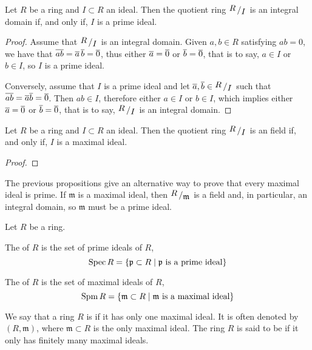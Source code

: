 \begin{prop}
	Let $R$ be a ring and $I \subset R$ an ideal. Then the quotient ring $\quotient{R}{I}$ is an integral domain if, and only if, $I$ is a prime ideal.
\end{prop}
\begin{proof}
	Assume that $\quotient{R}{I}$ is an integral domain. Given $a, b \in R$ satisfying $a b = 0$, we have that $\overline{a b} = \overline{a} \, \overline{b} = \overline{0}$, thus either $\overline{a} = \overline{0}$ or $\overline{b} = \overline{0}$, that is to say, $a \in I$ or $b \in I$, so $I$ is a prime ideal.
	
	Conversely, assume that $I$ is a prime ideal and let $\class{a}, \class{b} \in \quotient{R}{I}$ such that $\overline{a b} = \overline{a} \overline{b} = \overline{0}$. Then $a b \in I$, therefore either $a \in I$ or $b \in I$, which implies either $\overline{a} = \overline{0}$ or $\overline{b} = \overline{0}$, that is to say, $\quotient{R}{I}$ is an integral domain.
\end{proof}

\begin{prop}
	Let $R$ be a ring and $I \subset R$ an ideal. Then the quotient ring $\quotient{R}{I}$ is an field if, and only if, $I$ is a maximal ideal.
\end{prop}
\begin{proof}
	
\end{proof}

The previous propositions give an alternative way to prove that every maximal ideal is prime. If $\mathfrak{m}$ is a maximal ideal, then $\quotient{R}{\mathfrak{m}}$ is a field and, in particular, an integral domain, so $\mathfrak{m}$ must be a prime ideal.

\begin{definition}
	Let $R$ be a ring.
	\begin{enumeratedef}
		\item The  of $R$ is the set of prime ideals of $R$,
		\[
			\mathrm{Spec}\,R = \{ \mathfrak{p} \subset R \mid \mathfrak{p} \text{ is a prime ideal} \} 
		\]
		\item The  of $R$ is the set of maximal ideals of $R$,
		\[
			\mathrm{Spm}\,R = \{ \mathfrak{m} \subset R \mid \mathfrak{m} \text{ is a maximal ideal} \} 
		\]		
	\end{enumeratedef}
\end{definition}

\begin{definition}
	We say that a ring $R$ is  if it has only one maximal ideal. It is often denoted by $(R,\mathfrak{m})$, where $\mathfrak{m} \subset R$ is the only maximal ideal. The ring $R$ is said to be  if it only has finitely many maximal ideals.
\end{definition}

